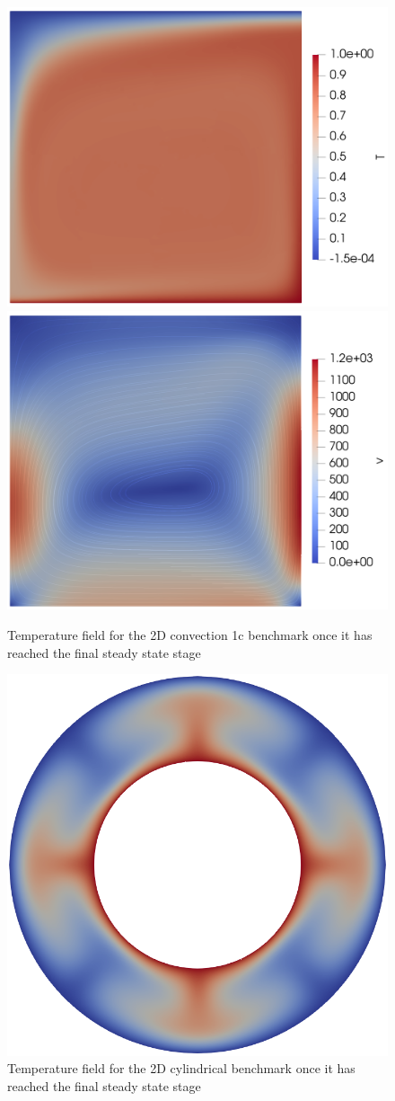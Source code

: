\begin{figure}
    \centering
    \includegraphics[width=0.75\linewidth]{img/chapter2/benchmarks/temp.png}
    \includegraphics[width=0.75\linewidth]{img/chapter2/benchmarks/streamlines.png}
    \caption{Temperature field for the 2D convection 1c benchmark once it has reached the final steady state stage}
    \label{fig:enter-label}
\end{figure}

\begin{figure}
    \centering
    \includegraphics[width=0.75\linewidth]{img/chapter2/benchmarks/t_1.png}
    \caption{Temperature field for the 2D cylindrical benchmark once it has reached the final steady state stage}
    \label{fig:enter-label}
\end{figure}


